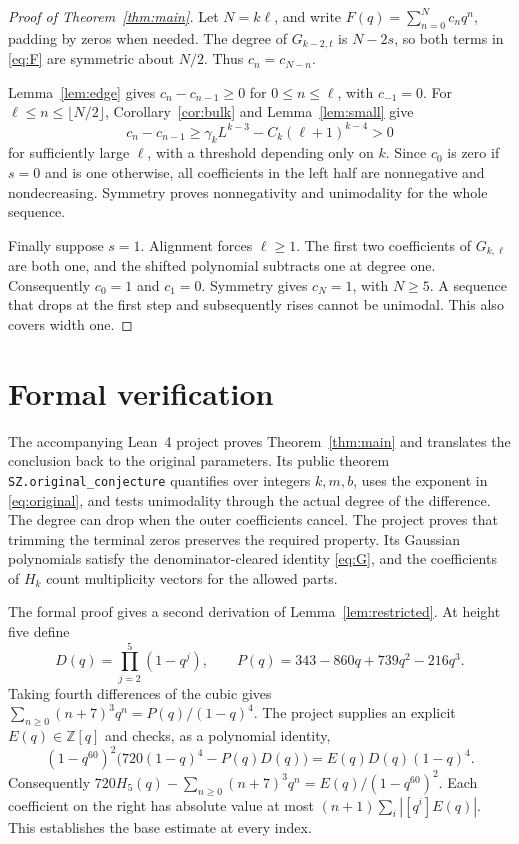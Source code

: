 \documentclass[3p,11pt,number]{elsarticle}
\theoremstyle{remark}
\numberwithin{equation}{section}
\begin{document}
\begin{proof}[Proof of Theorem~\ref{thm:main}]
Let \(N=k\ell\), and write \(F(q)=\sum_{n=0}^{N}c_nq^n\),
padding by zeros when needed.
The degree of \(G_{k-2,t}\) is \(N-2s\), so both terms in
\eqref{eq:F} are symmetric about \(N/2\). Thus \(c_n=c_{N-n}\).

Lemma~\ref{lem:edge} gives \(c_n-c_{n-1}\ge0\) for
\(0\le n\le\ell\), with \(c_{-1}=0\).
For \(\ell\le n\le\lfloor N/2\rfloor\),
Corollary~\ref{cor:bulk} and Lemma~\ref{lem:small} give
\[
c_n-c_{n-1}
\ge\gamma_kL^{k-3}-C_k(\ell+1)^{k-4}>0
\]
for sufficiently large \(\ell\), with a threshold depending only
on \(k\).
Since \(c_0\) is zero if \(s=0\) and is one otherwise, all
coefficients in the left half are nonnegative and nondecreasing.
Symmetry proves nonnegativity and unimodality for the whole sequence.

Finally suppose \(s=1\). Alignment forces \(\ell\ge1\).
The first two coefficients of \(G_{k,\ell}\) are both one, and
the shifted polynomial subtracts one at degree one. Consequently
\(c_0=1\) and \(c_1=0\). Symmetry gives \(c_N=1\), with \(N\ge5\).
A sequence that drops at the first step and subsequently rises
cannot be unimodal. This also covers width one.
\end{proof}

\section{Formal verification}\label{sec:formal}

The accompanying Lean~4 project proves Theorem~\ref{thm:main} and
translates the conclusion back to the original parameters. Its public
theorem \texttt{SZ.original\_conjecture} quantifies over integers
\(k,m,b\), uses the exponent in \eqref{eq:original}, and tests
unimodality through the actual degree of the difference. The degree
can drop when the outer coefficients cancel. The project proves that
trimming the terminal zeros preserves the required property.
Its Gaussian polynomials satisfy the denominator-cleared identity
\eqref{eq:G}, and the coefficients of \(H_k\) count multiplicity
vectors for the allowed parts.

The formal proof gives a second derivation of
Lemma~\ref{lem:restricted}. At height five define
\[
 D(q)=\prod_{j=2}^{5}(1-q^j),\qquad
 P(q)=343-860q+739q^2-216q^3 .
\]
Taking fourth differences of the cubic gives
\(\sum_{n\ge0}(n+7)^3q^n=P(q)/(1-q)^4\).
The project supplies an explicit \(E(q)\in\mathbb Z[q]\) and checks,
as a polynomial identity,
\[
 (1-q^{60})^2\bigl(720(1-q)^4-P(q)D(q)\bigr)
       =E(q)D(q)(1-q)^4.
\]
Consequently \(720H_5(q)-\sum_{n\ge0}(n+7)^3q^n
= E(q)/(1-q^{60})^2\). Each coefficient on the right has absolute
value at most \((n+1)\sum_i |[q^i]E(q)|\). This establishes the
base estimate at every index.
\end{document}
